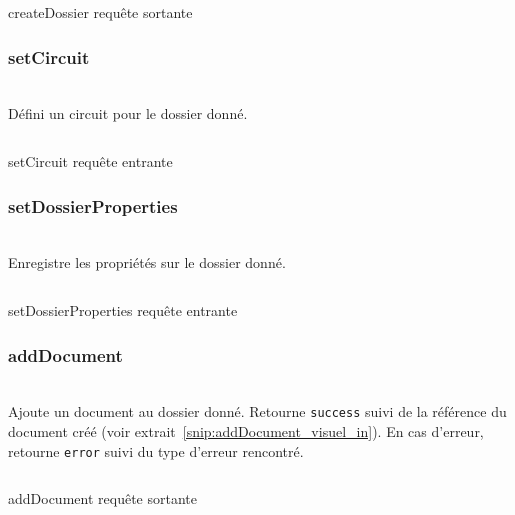\begin{codesnippet}
\inputminted[frame=single,linenos,fontsize=\footnotesize]{javascript}{extraits/createDossier_out.js}
\caption{createDossier requête sortante}
\label{snip:getDossier_out}
\end{codesnippet}


\subsubsection{setCircuit}
\\

Défini un circuit pour le dossier donné.

\begin{codesnippet}
\inputminted[frame=single,linenos,fontsize=\footnotesize]{javascript}{extraits/setCircuit_in.js}
\caption{setCircuit requête entrante}
\label{snip:setCircuit_in}
\end{codesnippet}



\subsubsection{setDossierProperties}
\\

Enregistre les propriétés sur le dossier donné.

\begin{codesnippet}
\inputminted[frame=single,linenos,fontsize=\footnotesize]{javascript}{extraits/setDossierProperties_in.js}
\caption{setDossierProperties requête entrante}
\label{snip:setDossierProperties_in}
\end{codesnippet}


\subsubsection{addDocument}
\\

Ajoute un document au dossier donné. Retourne \verb|success| suivi de la référence du document créé (voir extrait~\ref{snip:addDocument_visuel_in}). En cas d'erreur, retourne \verb|error| suivi du type d'erreur rencontré.

\begin{codesnippet}
\inputminted[frame=single,linenos,fontsize=\footnotesize]{javascript}{extraits/addDocument_visuel_out.js}
\caption{addDocument requête sortante}
\label{snip:addDocument_visuel_out}
\end{codesnippet}


